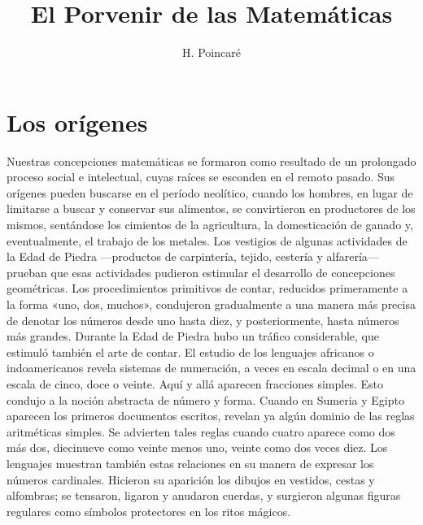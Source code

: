 \documentclass[a4paper, 12pt]{article}
\title{El Porvenir de las Matemáticas}
\author{H. Poincaré}
\date{}
\begin{document}
\begin{tcolorbox}[colback=blue!5!white,colframe=blue!75!black]

\vspace{-1.8cm}
\textbf \maketitle

\end{tcolorbox}

\bigskip

\tableofcontents

\newpage

\section*{Los orígenes}

\setcounter{page}{1}

Nuestras concepciones matemáticas se formaron como resultado de un prolongado
proceso social e intelectual, cuyas raíces se esconden en el remoto pasado. Sus
orígenes pueden buscarse en el período neolítico, cuando los hombres, en lugar
de limitarse a buscar y conservar sus alimentos, se convirtieron en productores
de los mismos, sentándose los cimientos de la agricultura, la domesticación de
ganado y, eventualmente, el trabajo de los metales. Los vestigios de algunas
actividades de la Edad de Piedra ---productos de carpintería, tejido, cestería y
alfarería--- prueban que esas actividades pudieron estimular el desarrollo de
concepciones geométricas. Los procedimientos primitivos de contar, reducidos
primeramente a la forma  «uno, dos, muchos», condujeron gradualmente a una
manera más precisa de denotar los números desde uno hasta diez, y
posteriormente, hasta números más grandes. Durante la Edad de Piedra hubo un
tráfico considerable, que estimuló también el arte de contar. El estudio de los
lenguajes africanos o indoamericanos revela sistemas de numeración, a veces en
escala decimal o en una escala de cinco, doce o veinte. Aquí y allá aparecen
fracciones simples. Esto condujo a la noción abstracta de número y forma. Cuando
en Sumeria y Egipto aparecen los primeros documentos escritos, revelan ya algún
dominio de las reglas aritméticas simples. Se advierten tales reglas cuando
cuatro aparece como dos más dos, diecinueve como veinte menos uno, veinte como
dos veces diez. Los lenguajes muestran también estas relaciones en su manera de
expresar los números cardinales. Hicieron su aparición los dibujos en vestidos,
cestas y alfombras; se tensaron, ligaron y anudaron cuerdas, y surgieron algunas
figuras regulares como símbolos protectores en los ritos mágicos.
\end{document}
